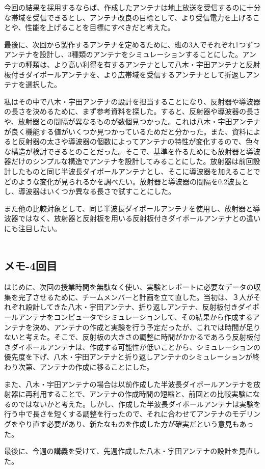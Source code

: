 \documentclass[dvipdfmx,autodetect-engine,titlepage]{jsarticle}
\begin{document}
今回の結果を採用するならば、作成したアンテナは地上放送を受信するのに十分な帯域を受信できるとし、アンテナ改良の目標として、より受信電力を上げることや、性能を上げることを目標にすべきだと考えた。

最後に、次回から製作するアンテナを定めるために、班の3人でそれぞれ1つずつアンテナを設計し、3種類のアンテナをシミュレーションすることにした。アンテナの種類は、より高い利得を有するアンテナとして八木・宇田アンテナと反射板付きダイポールアンテナを、より広帯域を受信するアンテナとして折返しアンテナを選択した。

私はその中で八木・宇田アンテナの設計を担当することになり、反射器や導波器の長さを決めるために、まず参考資料を探した。すると、反射器や導波器の長さや、放射器との間隔が異なるものが数個見つかった。これは八木・宇田アンテナが良く機能する値がいくつか見つかっているためだと分かった。また、資料によると反射器の太さや導波器の個数によってアンテナの特性が変化するので、色々な構造が検討できるとのことだった。そこで、基準を作るためにも放射器と導波器だけのシンプルな構造でアンテナを設計してみることにした。放射器は前回設計したものと同じ半波長ダイポールアンテナとし、そこに導波器を加えることでどのような変化が見られるかを調べたい。放射器と導波器の間隔を0.2波長とし、導波器はいくつか異なる長さで試すことにした。

また他の比較対象として、同じ半波長ダイポールアンテナを使用し、放射器と導波器ではなく、放射器と反射板を用いる反射板付きダイポールアンテナとの違いにも注目したい。\\\\

\subsection{メモ-4回目}
はじめに、次回の授業時間を無駄なく使い、実験とレポートに必要なデータの収集を完了させるために、チームメンバーと計画を立て直した。当初は、３人がそれぞれ設計してきた八木・宇田アンテナ、折り返しアンテナ、反射板付きダイポールアンテナをコンピュータでシミュレーションして、その結果から作成するアンテナを決め、アンテナの作成と実験を行う予定だったが、これでは時間が足りないと考えた。そこで、反射板の大きさの調整に時間がかかるであろう反射板付きダイポールアンテナは、作成する可能性が低いことから、シミュレーションの優先度を下げ、八木・宇田アンテナと折り返しアンテナのシミュレーションが終わり次第、アンテナの作成に移ることにした。

また、八木・宇田アンテナの場合は以前作成した半波長ダイポールアンテナを放射器に再利用することで、アンテナの作成時間の短縮と、前回との比較実験になるのではないかと考えた。しかし、作成した半波長ダイポールアンテナは実験を行う中で長さを短くする調整を行ったので、それに合わせてアンテナのモデリングをやり直す必要があり、新たなものを作成した方が確実だという意見もあった。

最後に、今週の講義を受けて、先週作成した八木・宇田アンテナの設計を見直した。\\
\end{document}

